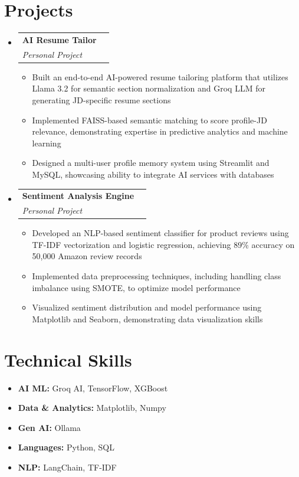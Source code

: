 \documentclass[a4paper,11pt]{article}
\makeatletter
\newcommand{\resumeProject}[4]{
\vspace{0.5mm}\item
    \begin{tabular*}{0.98\textwidth}[t]{l@{\extracolsep{\fill}}r}
        \textbf{#1} & \textit{\small #3} \\
        \textit{\small #2} & \small #4 \\
    \end{tabular*}
    \vspace{-2.4mm}
}
\newcommand{\resumeSubHeadingListStart}{\begin{itemize}[leftmargin=*,labelsep=1.5mm]}
\newcommand{\resumeSubHeadingListEnd}{\end{itemize}\vspace{2mm}}
\newcommand{\resumeItemListStart}{
    \begin{justify}
    \begin{itemize}[leftmargin=3ex, rightmargin=2ex, noitemsep, labelsep=1.2mm, itemsep=0mm]
    \small
}
\newcommand{\resumeItemListEnd}{\end{itemize}\end{justify}\vspace{-2mm}}
\newcommand{\resumeHeadingSkillStart}{\begin{itemize}[leftmargin=*,itemsep=1.7mm, rightmargin=2ex]}
\newcommand{\resumeHeadingSkillEnd}{\end{itemize}\vspace{-2mm}}
\makeatother
\begin{document}
\section{Projects}
\resumeSubHeadingListStart
  \resumeProject
    {AI Resume Tailor}
    {Personal Project}
    {}
    {{}}
    \resumeItemListStart
      \item {Built an end-to-end AI-powered resume tailoring platform that utilizes Llama 3.2 for semantic section normalization and Groq LLM for generating JD-specific resume sections}
      \item {Implemented FAISS-based semantic matching to score profile-JD relevance, demonstrating expertise in predictive analytics and machine learning}
      \item {Designed a multi-user profile memory system using Streamlit and MySQL, showcasing ability to integrate AI services with databases}
    \resumeItemListEnd
  \resumeProject
    {Sentiment Analysis Engine}
    {Personal Project}
    {}
    {{}}
    \resumeItemListStart
      \item {Developed an NLP-based sentiment classifier for product reviews using TF-IDF vectorization and logistic regression, achieving 89\% accuracy on 50,000 Amazon review records}
      \item {Implemented data preprocessing techniques, including handling class imbalance using SMOTE, to optimize model performance}
      \item {Visualized sentiment distribution and model performance using Matplotlib and Seaborn, demonstrating data visualization skills}
    \resumeItemListEnd
\resumeSubHeadingListEnd
\vspace{-5.5mm}

\section{Technical Skills}
\resumeHeadingSkillStart
  \item \textbf{AI ML: }Groq AI, TensorFlow, XGBoost
  \item \textbf{Data \& Analytics: }Matplotlib, Numpy
  \item \textbf{Gen AI: }Ollama
  \item \textbf{Languages: }Python, SQL
  \item \textbf{NLP: }LangChain, TF-IDF
\resumeHeadingSkillEnd
\vspace{-1mm}
\end{document}
